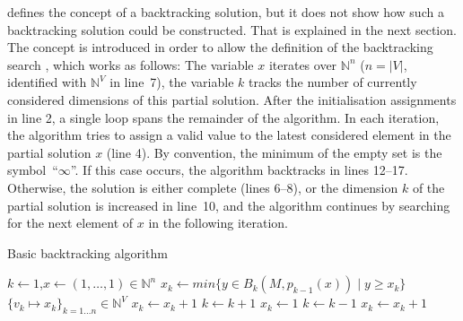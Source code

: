      defines the concept of a backtracking solution, but
    it does not show how such a backtracking solution could be constructed.
    That is explained in the next section.
    The concept is introduced in order to allow the definition of the
    backtracking search , which works as follows:
    The variable $x$ iterates over $\mathbb N^n$
    ($n=|V|$, identified with $\mathbb N^V$ in line~7), the variable $k$
    tracks the number of currently considered dimensions of this partial
    solution.
    After the initialisation assignments in line 2, a single loop spans the
    remainder of the algorithm.
    In each iteration, the algorithm tries to assign a valid value to the latest
    considered element in the partial solution $x$ (line 4).
    By convention, the minimum of the empty set is the
    \mbox{symbol ``$\infty$''}.
    If this case occurs, the algorithm backtracks in lines 12--17.
    Otherwise, the solution is either complete (lines 6--8), or the dimension
    $k$ of the partial solution is increased in \mbox{line 10}, and the
    algorithm continues by searching for the next element of $x$ in the
    following iteration.

\begin{algorithm}[p]
    \caption{Basic backtracking algorithm}
    \begin{algorithmic}[1]
        \vspace{-0.45em}
            \State $k\gets1$,\quad$x\gets(1,\dots,1)\in\mathbb N^n$\vspace{-0.45em}
            \vspace{-0.45em}
                \State $x_k\gets min\{y\in B_k(M,p_{k-1}(x))\mid y\geq x_k\}$\vspace{-0.45em}
                \vspace{-0.45em}
                    \vspace{-0.45em}
                         $\{v_k\mapsto x_k\}_{k=1\dots n}\in\mathbb N^V$\vspace{-0.45em}
                        \State $x_k\gets x_k+1$\vspace{-0.45em}
                    \Else\vspace{-0.45em}
                        \State $k\gets k+1$\vspace{-0.45em}
                        \State $x_k\gets1$\vspace{-0.45em}
                    \EndIf
                \Else\vspace{-0.45em}
                    \State $k\gets k-1$\vspace{-0.45em}
                    \vspace{-0.45em}
                        \State$x_k\gets x_k+1$\vspace{-0.45em}
                    \Else\vspace{-0.45em}
                    \EndIf
                \EndIf
            \EndWhile
        \EndProcedure
    \end{algorithmic}
    \label{backtrackalg}
\end{algorithm}

